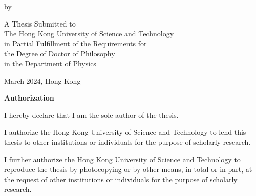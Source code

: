 

\null\vspace{0.5in}
\begin{center}
	{\huge \bf \thesisWriter}
	\vspace{2.5cm}
	
	{\Large by}
	\vspace{0.5cm}
	
	{\Large\bf \ThesisTitle{}}\normalsize
	\vspace{2.5cm}
	
	A Thesis Submitted to \\
	The Hong Kong University of Science and Technology \\
	in Partial Fulfillment of the Requirements for \\
	the Degree of Doctor of Philosophy \\
	in the Department of Physics
	\vspace{1.5cm}
	
	March 2024, Hong Kong
\end{center}

\newpage

\begin{center}{\Large\bf Authorization}\normalsize
\end{center}
\vspace{0.5cm}

I hereby declare that I am the sole author of the thesis.

\vspace{0.5cm}

I authorize the Hong Kong University of Science and Technology to lend this thesis
to other institutions or individuals for the purpose of scholarly research.

\vspace{0.5cm}

I further authorize the Hong Kong University of Science and Technology to
reproduce the thesis by photocopying or by other means, in total or in
part, at the request of other institutions or individuals for the
purpose of scholarly research.

\vspace{0.3cm}


